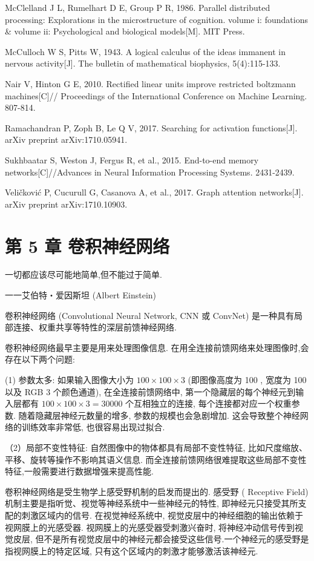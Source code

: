 \documentclass[10pt]{article}
\begin{document}
McClelland J L, Rumelhart D E, Group P R, 1986. Parallel distributed processing: Explorations in the microstructure of cognition. volume i: foundations \& volume ii: Psychological and biological models[M]. MIT Press.

McCulloch W S, Pitts W, 1943. A logical calculus of the ideas immanent in nervous activity[J]. The bulletin of mathematical biophysics, 5(4):115-133.

Nair V, Hinton G E, 2010. Rectified linear units improve restricted boltzmann machines[C]// Proceedings of the International Conference on Machine Learning. 807-814.

Ramachandran P, Zoph B, Le Q V, 2017. Searching for activation functions[J]. arXiv preprint arXiv:1710.05941.

Sukhbaatar S, Weston J, Fergus R, et al., 2015. End-to-end memory networks[C]//Advances in Neural Information Processing Systems. 2431-2439.

Veličković P, Cucurull G, Casanova A, et al., 2017. Graph attention networks[J]. arXiv preprint arXiv:1710.10903.

\section*{第 5 章 卷积神经网络}
一切都应该尽可能地简单,但不能过于简单.

一一艾伯特・爱因斯坦 (Albert Einstein)

卷积神经网络 (Convolutional Neural Network, CNN 或 ConvNet) 是一种具有局部连接、权重共享等特性的深层前馈神经网络.

卷积神经网络最早主要是用来处理图像信息. 在用全连接前馈网络来处理图像时,会存在以下两个问题:

(1) 参数太多: 如果输入图像大小为 $100 \times 100 \times 3$ (即图像高度为 100 , 宽度为 100 以及 RGB 3 个颜色通道), 在全连接前馈网络中, 第一个隐藏层的每个神经元到输入层都有 $100 \times 100 \times 3=30000$ 个互相独立的连接, 每个连接都对应一个权重参数. 随着隐藏层神经元数量的增多, 参数的规模也会急剧增加. 这会导致整个神经网络的训练效率非常低, 也很容易出现过拟合.

（2）局部不变性特征: 自然图像中的物体都具有局部不变性特征, 比如尺度缩放、平移、旋转等操作不影响其语义信息. 而全连接前馈网络很难提取这些局部不变性特征,一般需要进行数据增强来提高性能.

卷积神经网络是受生物学上感受野机制的启发而提出的. 感受野 ( Receptive Field) 机制主要是指听觉、视觉等神经系统中一些神经元的特性, 即神经元只接受其所支配的刺激区域内的信号. 在视觉神经系统中, 视觉皮层中的神经细胞的输出依赖于视网膜上的光感受器. 视网膜上的光感受器受刺激兴奋时, 将神经冲动信号传到视觉皮层, 但不是所有视觉皮层中的神经元都会接受这些信号.一个神经元的感受野是指视网膜上的特定区域, 只有这个区域内的刺激才能够激活该神经元.
\end{document}
